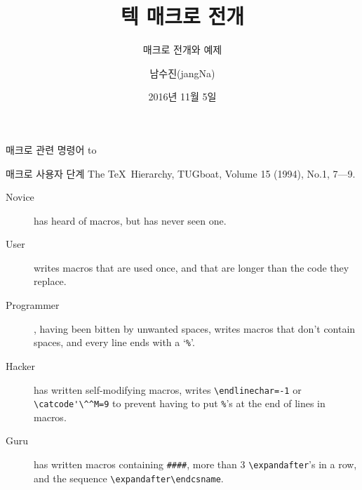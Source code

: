 \documentclass{beamer}
\title{텍 매크로 전개}
\subtitle{매크로 전개와 예제}
\author{남수진(jangNa)}
\date{2016년 11월 5일}
\institute{
  2016 공주대학교 문서작성 워크숍 2016\\
  공주대학교 인문사회과학관 1층 컴퓨터실 107호}
\begin{document}
\maketitle


%
\begin{frame}{매크로 관련 명령어}
  \vspace{4mm}
  \hbox to
\end{frame}


%
\begin{frame}[fragile]{매크로 사용자 단계}
  The \TeX\ Hierarchy, TUGboat, Volume 15 (1994), No.1, 7---9.
  \begin{description}
  \item [Novice] has heard of macros, but has never seen one.
  \item [User] writes macros that are used once, and that are
    longer than the code they replace.
  \item [Programmer], having been bitten by unwanted spaces,
    writes macros that don't contain spaces, and every line ends with
    a `{\small\verb+%+}'.
  \item [Hacker] has written self-modifying macros, writes
    {\small\verb+\endlinechar=-1+} or {\small\verb+\catcode'\^^M=9+}
    to prevent having to put {\small\verb+%+}'s at the end of lines in macros.
  \item [Guru] has written macros containing {\small\verb+####+}, more than 3
    {\small\verb+\expandafter+}'s in a row, and the sequence
    {\small\verb+\expandafter\endcsname+}.
  \end{description}
\end{frame}
\end{document}
